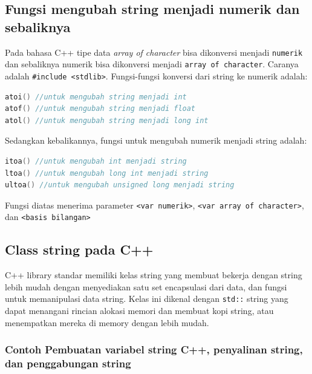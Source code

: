 \subsection{Fungsi mengubah string menjadi numerik dan
sebaliknya}\label{fungsi-mengubah-string-menjadi-numerik-dan-sebaliknya}

Pada bahasa C++ tipe data \emph{array of character} bisa dikonversi
menjadi \texttt{numerik} dan sebaliknya numerik bisa dikonversi menjadi
\texttt{array\ of\ character}. Caranya adalah
\texttt{\#include\ \textless{}stdlib\textgreater{}}. Fungsi-fungsi
konversi dari string ke numerik adalah:

\begin{lstlisting}[language=c++, numbers=none]
atoi() //untuk mengubah string menjadi int
atof() //untuk mengubah string menjadi float
atol() //untuk mengubah string menjadi long int
\end{lstlisting}

Sedangkan kebalikannya, fungsi untuk mengubah numerik menjadi string
adalah:

\begin{lstlisting}[language=c++, numbers=none]
itoa() //untuk mengubah int menjadi string
ltoa() //untuk mengubah long int menjadi string
ultoa() //untuk mengubah unsigned long menjadi string
\end{lstlisting}

Fungsi diatas menerima parameter
\texttt{\textless{}var\ numerik\textgreater{}},
\texttt{\textless{}var\ array\ of\ character\textgreater{}}, dan
\texttt{\textless{}basis\ bilangan\textgreater{}}

\subsection{Class string pada C++}\label{class-string-pada-c}

C++ library standar memiliki kelas string yang membuat bekerja dengan
string lebih mudah dengan menyediakan satu set encapsulasi dari data,
dan fungsi untuk memanipulasi data string. Kelas ini dikenal dengan
\texttt{std::} string yang dapat menangani rincian alokasi memori dan
membuat kopi string, atau menempatkan mereka di memory dengan lebih
mudah.

\subsubsection*{Contoh  Pembuatan variabel string C++, penyalinan string, dan
penggabungan string}

